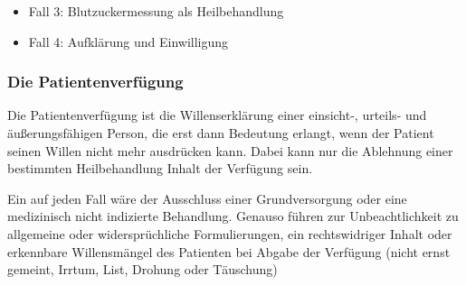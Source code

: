 {
\begin{itemize}
  \item Fall 3: Blutzuckermessung als Heilbehandlung
  \dotfill{}
  \item Fall 4: Aufklärung und Einwilligung
  \dotfill{}
\end{itemize}
}
{}
{}
{}
{}

\subsubsection{Die Patientenverfügung}

\Text
{{\TxBeschreibung}}%
{%
Die Patientenverfügung ist die Willenserklärung einer
einsicht-, urteils- und äußerungsfähigen Person, die
erst dann Bedeutung erlangt, wenn der Patient seinen Willen
nicht mehr ausdrücken kann.
Dabei kann nur die Ablehnung einer bestimmten
Heilbehandlung Inhalt der Verfügung sein.

Ein auf jeden Fall  wäre der
Ausschluss einer Grundversorgung oder eine medizinisch
nicht indizierte Behandlung. Genauso führen zur
Unbeachtlichkeit zu
allgemeine oder widersprüchliche Formulierungen, ein
rechtswidriger Inhalt oder erkennbare Willensmängel des
Patienten bei Abgabe der Verfügung (nicht ernst gemeint,
Irrtum, List, Drohung oder Täuschung)
}%


